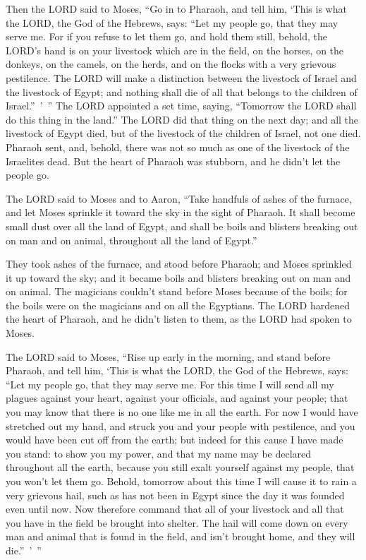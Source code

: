 \mychapter{} \myverse*{}Then the LORD said to Moses, “Go in to Pharaoh, and tell him, ‘This is what the LORD, the God of the Hebrews, says: “Let my people go, that they may serve me. \myverse{}For if you refuse to let them go, and hold them still, \myverse{}behold, the LORD’s hand is on your livestock which are in the field, on the horses, on the donkeys, on the camels, on the herds, and on the flocks with a very grievous pestilence. \myverse{}The LORD will make a distinction between the livestock of Israel and the livestock of Egypt; and nothing shall die of all that belongs to the children of Israel.” ’ ” \myverse{}The LORD appointed a set time, saying, “Tomorrow the LORD shall do this thing in the land.” \myverse{}The LORD did that thing on the next day; and all the livestock of Egypt died, but of the livestock of the children of Israel, not one died. \myverse{}Pharaoh sent, and, behold, there was not so much as one of the livestock of the Israelites dead. But the heart of Pharaoh was stubborn, and he didn’t let the people go.


\myverse{}The LORD said to Moses and to Aaron, “Take handfuls of ashes of the furnace, and let Moses sprinkle it toward the sky in the sight of Pharaoh. \myverse{}It shall become small dust over all the land of Egypt, and shall be boils and blisters breaking out on man and on animal, throughout all the land of Egypt.”


\myverse{}They took ashes of the furnace, and stood before Pharaoh; and
Moses sprinkled it up toward the sky; and it became boils and blisters breaking out on man and on animal. \myverse{}The magicians couldn’t stand before Moses because of the boils; for the boils
were on the magicians and on all the Egyptians. \myverse{}The LORD hardened the heart of Pharaoh, and he didn’t listen to them, as the
LORD had spoken to Moses.


\myverse{}The LORD said to Moses, “Rise up early in the morning, and stand
before Pharaoh, and tell him, ‘This is what the LORD, the God of the Hebrews, says: “Let my people go,
that they may serve me.
\myverse{}For this time I will send all my plagues against your heart, against your
officials, and against your people; that you may know that there is no one like me in all the earth.
\myverse{}For now I would have stretched out my hand, and struck you and your people
with pestilence, and you would have been cut off from the earth;
\myverse{}but indeed for this cause I have made you stand: to show you my power, and
that my name may be declared throughout all the earth,
\myverse{}because you still exalt yourself against my people, that you won’t let them
go.
\myverse{}Behold, tomorrow about this time I will cause it to rain a very grievous hail,
such as has not been in Egypt since the day it was founded even until now.
\myverse{}Now therefore command that all of your livestock and all that you have in
the field be brought into shelter. The hail will come down on every man and animal that is found in the
field, and isn’t brought home, and they will die.” ’ ”


